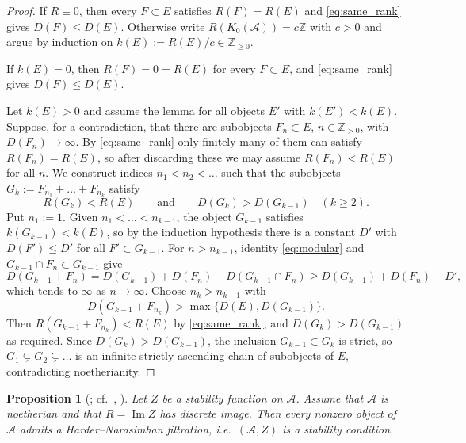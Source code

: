 \documentclass[12pt]{amsart}
\newtheorem{proposition}[theorem]{Proposition}
\numberwithin{theorem}{section}
\theoremstyle{definition}
\newcommand{\ZZ}{\mathbb{Z}}
\newcommand{\calA}{\mathcal{A}}
\newcommand{\Kgroup}{K_0}
\newcommand{\im}{\operatorname{Im}}
\begin{document}
	\begin{proof}
		If $R \equiv 0$, then every $F \subset E$ satisfies $R(F) = R(E)$ and \eqref{eq:same_rank} gives $D(F) \leqslant D(E)$.
		Otherwise write $R(\Kgroup(\calA)) = c \ZZ$ with $c > 0$ and argue by induction on $k(E) := R(E) / c \in \ZZ_{\geqslant 0}$.
		
		If $k(E) = 0$, then $R(F) = 0 = R(E)$ for every $F \subset E$, and \eqref{eq:same_rank} gives $D(F) \leqslant D(E)$.
		
		Let $k(E) > 0$ and assume the lemma for all objects $E'$ with $k(E') < k(E)$.
		Suppose, for a contradiction, that there are subobjects $F_n \subset E$, $n \in \ZZ_{>0}$, with $D(F_n) \to \infty$.
		By \eqref{eq:same_rank} only finitely many of them can satisfy $R(F_n) = R(E)$, so after discarding these we may assume $R(F_n) < R(E)$ for all $n$.
		We construct indices $n_1 < n_2 < \ldots$ such that the subobjects $G_k := F_{n_1} + \ldots + F_{n_k}$ satisfy
		\[
		R(G_k) < R(E)
		\qquad\text{and}\qquad
		D(G_k) > D(G_{k-1}) \quad (k \geqslant 2).
		\]
		Put $n_1 := 1$.
		Given $n_1 < \ldots < n_{k-1}$, the object $G_{k-1}$ satisfies $k(G_{k-1}) < k(E)$, so by the induction hypothesis there is a constant $D'$ with $D(F') \leqslant D'$ for all $F' \subset G_{k-1}$.
		For $n > n_{k-1}$, identity \eqref{eq:modular} and $G_{k-1} \cap F_n \subset G_{k-1}$ give
		\[
		D(G_{k-1} + F_n) = D(G_{k-1}) + D(F_n) - D(G_{k-1} \cap F_n) \geqslant D(G_{k-1}) + D(F_n) - D' ,
		\]
		which tends to $\infty$ as $n \to \infty$.
		Choose $n_k > n_{k-1}$ with 
		\[
		D(G_{k-1} + F_{n_k}) > \max \{ D(E), D(G_{k-1}) \}.
		\]
		Then $R(G_{k-1} + F_{n_k}) < R(E)$ by \eqref{eq:same_rank}, and $D(G_k) > D(G_{k-1})$ as required.
		Since $D(G_k) > D(G_{k-1})$, the inclusion $G_{k-1} \subset G_k$ is strict, so $G_1 \subsetneq G_2 \subsetneq \ldots$ is an infinite strictly ascending chain of subobjects of $E$, contradicting noetherianity.
	\end{proof}
	
	\begin{proposition}[{\cite[Prop.~4.10]{MS17}}; cf.\ {\cite[Thm~2]{Rud97}}, {\cite[Prop.~2.4]{Bri07}}]
		\label{prop:HN_existence}
		Let $Z$ be a stability function on $\calA$.
		Assume that $\calA$ is noetherian and that $R = \im Z$ has discrete image.
		Then every nonzero object of $\calA$ admits a Harder--Narasimhan filtration, i.e.\ $(\calA, Z)$ is a stability condition.
	\end{proposition}
	
\end{document}
